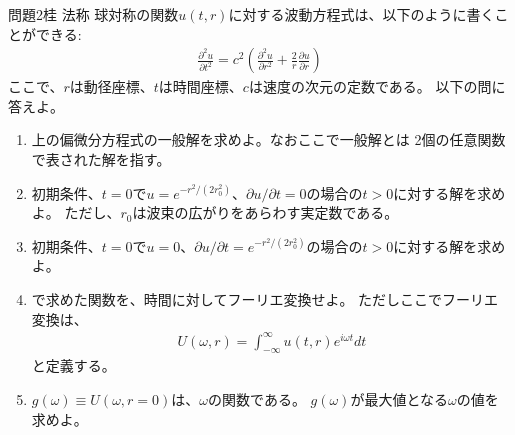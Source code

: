 \documentclass[fleqn]{jbook}
\begin{document}
\begin{question}{問題2}{桂 法称}
球対称の関数$u(t, r)$に対する波動方程式は、以下のように書くことができる:
\begin{eqnarray*}
\frac{\partial^2 u}{\partial t^2} = c^2 \left( 
\frac{\partial^2 u}{\partial r^2} + \frac{2}{r} 
\frac{\partial u}{\partial r} \right)
\end{eqnarray*}
ここで、$r$は動径座標、$t$は時間座標、$c$は速度の次元の定数である。
以下の問に答えよ。
\begin{enumerate}
\item 上の偏微分方程式の一般解を求めよ。なおここで一般解とは
2個の任意関数で表された解を指す。

\item 初期条件、$t = 0$で$u = e^{-r^2/(2r_0^2)}$、$\partial u / 
\partial t = 0$の場合の$t > 0$に対する解を求めよ。
ただし、$r_0$は波束の広がりをあらわす実定数である。

\item 初期条件、$t = 0$で$u = 0$、$\partial u / 
\partial t = e^{-r^2/(2r_0^2)}$の場合の$t > 0$に対する解を求めよ。

\item {}で求めた関数を、時間に対してフーリエ変換せよ。
ただしここでフーリエ変換は、
\begin{eqnarray*}
U(\omega, r) = \int _{- \infty} ^{\infty} u(t ,r)e^{i\omega t}dt
\end{eqnarray*}
と定義する。

\item $g(\omega) \equiv U(\omega, r=0)$は、$\omega$の関数である。
$g(\omega)$が最大値となる$\omega$の値を求めよ。
\end{enumerate}
\end{question}
\end{document}
